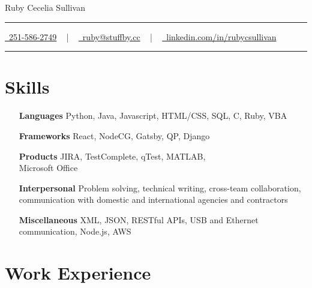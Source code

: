 \documentclass[letterpaper,10pt]{article}
\newcommand{\documentTitle}[2]{
  \begin{center}
    {\Huge\color{accentTitle} #1}
    \vspace{10pt}
    {\color{accentLine} \hrule}
    \vspace{2pt}
    \footnotesize{#2}
    \vspace{2pt}
    {\color{accentLine} \hrule}
  \end{center}
}
\begin{document}

  \documentTitle{Ruby Cecelia Sullivan}{
    \href{tel:2515862749}{
      \raisebox{-0.05\height} \faPhone\ 251-586-2749} ~ | ~
    \href{mailto:ruby@stuffby.cc}{
      \raisebox{-0.15\height} \faEnvelope\ ruby@stuffby.cc} ~ | ~
    \href{https://linkedin.com/in/rubycsullivan/}{
      \raisebox{-0.15\height} \faLinkedin\ linkedin.com/in/rubycsullivan}
  }


  \section{Skills}

  \begin{multicols}{2}
    \begin{itemize}[itemsep=-2px, parsep=1pt, leftmargin=75pt]
      \item[\textbf{Languages}] Python, Java, Javascript, HTML/CSS, SQL, C, Ruby, VBA
      \item[\textbf{Frameworks}] React, NodeCG, Gatsby, QP, Django
      \item[\textbf{Products}] JIRA, TestComplete, qTest, MATLAB, \\Microsoft Office
      \item[\textbf{Interpersonal}] Problem solving, technical writing, cross-team collaboration, communication with domestic and international agencies and contractors
      \item[\textbf{Miscellaneous}] XML, JSON, RESTful APIs, USB and Ethernet communication, Node.js, AWS
    \end{itemize}
  \end{multicols}


  \section{Work Experience}
\end{document}
